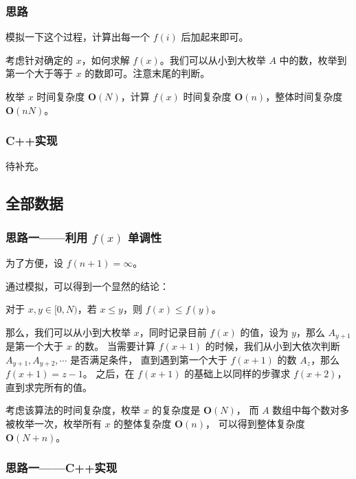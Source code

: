 \documentclass[cn,10pt,math=newtx,citestyle=gb7714-2015,bibstyle=gb7714-2015]{elegantbook}
\begin{document}
\subsubsection{思路}

模拟一下这个过程，计算出每一个 $f(i)$ 后加起来即可。

考虑针对确定的 $x$，如何求解 $f(x)$。我们可以从小到大枚举 $A$ 中的数，枚举到第一个大于等于 $x$ 的数即可。注意末尾的判断。

枚举 $x$ 时间复杂度 $\mathbf{O}(N)$，计算 $f(x)$ 时间复杂度 $\mathbf{O}(n)$，整体时间复杂度 $\mathbf{O}(nN)$。

\subsubsection{C++实现}

待补充。

\subsection{全部数据}

\subsubsection{思路一——利用 $f(x)$ 单调性}

为了方便，设 $f(n+1) = \infty$。

通过模拟，可以得到一个显然的结论：

\begin{theorem}[$f(x)$的单调性] \label{thm:fx_monotonicity} 
  对于 $x,y\in [0,N)$，若 $x \le y$，则 $f(x) \le f(y)$。
\end{theorem}

那么，我们可以从小到大枚举 $x$，同时记录目前 $f(x)$ 的值，设为 $y$，那么 $A_{y+1}$ 是第一个大于 $x$ 的数。
当需要计算 $f(x+1)$ 的时候，我们从小到大依次判断 $A_{y+1},A_{y+2},\cdots$ 是否满足条件，
直到遇到第一个大于 $f(x+1)$ 的数 $A_z$，那么 $f(x+1)=z-1$。
之后，在 $f(x+1)$ 的基础上以同样的步骤求 $f(x+2)$，直到求完所有的值。

考虑该算法的时间复杂度，枚举 $x$ 的复杂度是 $\mathbf{O}(N)$，
而 $A$ 数组中每个数对多被枚举一次，枚举所有 $x$ 的整体复杂度 $\mathbf{O}(n)$，
可以得到整体复杂度 $\mathbf{O}(N+n)$。

\subsubsection{思路一——C++实现}


\end{document}
